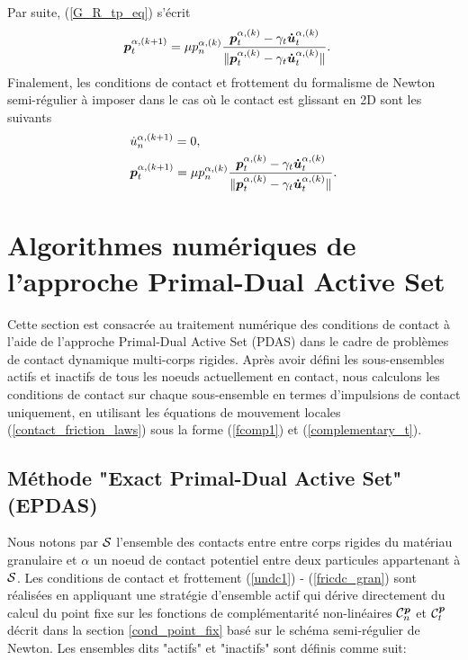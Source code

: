 Par suite, (\ref{G_R_tp_eq}) s'écrit 
\begin{align}
&\boldsymbol{p}_{t}^{\alpha,(k+1)} = \mu p^{\alpha,(k)}_n \frac{\boldsymbol{p}^{\alpha,(k)}_t - \gamma_t \boldsymbol{\dot{u}}^{\alpha,(k)}_t}{\|\boldsymbol{p}^{\alpha,(k)}_t - \gamma_t \boldsymbol{\dot{u}}^{\alpha,(k)}_t\|}.
\end{align}
Finalement, les conditions de contact et frottement du formalisme de Newton semi-régulier à imposer dans le cas où le contact est glissant en 2D sont les suivants
\begin{align}
&\dot{u}^{\alpha,(k+1)}_n=0,\\
&\boldsymbol{p}_{t}^{\alpha,(k+1)} = \mu p^{\alpha,(k)}_n \frac{\boldsymbol{p}^{\alpha,(k)}_t - \gamma_t \boldsymbol{\dot{u}}^{\alpha,(k)}_t}{\|\boldsymbol{p}^{\alpha,(k)}_t - \gamma_t \boldsymbol{\dot{u}}^{\alpha,(k)}_t\|}.
\end{align}

\section{Algorithmes numériques de l'approche Primal-Dual Active Set}\label{activ_nscd}

Cette section est consacrée au traitement numérique des conditions de contact à l'aide de l'approche Primal-Dual Active Set (PDAS) dans le cadre de problèmes de contact dynamique multi-corps rigides. Après avoir défini les sous-ensembles actifs et inactifs de tous les noeuds actuellement en contact, nous calculons les conditions de contact sur chaque sous-ensemble en termes d'impulsions de contact uniquement, en utilisant les équations de mouvement locales (\ref{contact_friction_laws}) sous la forme (\ref{fcomp1}) et (\ref{complementary_t}).

\subsection{Méthode "Exact Primal-Dual Active Set" (EPDAS)}\label{epdas}
Nous notons par ${\cal S}$ l'ensemble des contacts entre entre corps rigides du matériau granulaire et $\alpha $ un noeud de contact potentiel entre deux particules appartenant à $ {\cal S} $. Les conditions de contact et frottement (\ref{undc1}) - (\ref{fricdc_gran}) sont réalisées en appliquant une stratégie d'ensemble actif qui dérive directement du calcul du point fixe sur les fonctions de complémentarité non-linéaires $ {\cal C }_{n}^{\boldsymbol{p}} $ et $ {\cal C}_{t}^{\boldsymbol{p}} $ décrit dans la section \ref{cond_point_fix} basé sur le schéma semi-régulier de Newton. Les ensembles dits "actifs" et "inactifs" sont définis comme suit:


